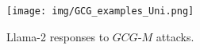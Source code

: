 \begin{figure}[!htb]
    \centering
    \texttt{[image: img/GCG\_examples\_Uni.png]}
    \caption{Llama-2 responses to $GCG\text{-}M$ attacks.}
    \label{fig:universal-attacks}
\end{figure}